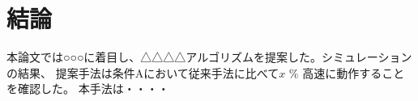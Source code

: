 \chapter{結論}


本論文では○○○に着目し、△△△△アルゴリズムを提案した。シミュレーションの結果、
提案手法は条件Aにおいて従来手法に比べて$x$ \% 高速に動作することを確認した。
本手法は・・・・


\begin{comment}
    \textblockcolour{pink}
    \begin{textblock}{4}(16, 1)
        【5】本文はここまで
    \end{textblock}
    
    \begin{textblock}{7}(11, 28)
        本文は20ページ以上を目安とする。
    \end{textblock}
\end{comment}
  
